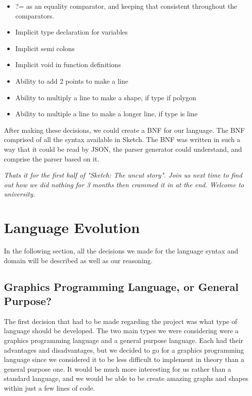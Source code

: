 \documentclass{l3proj}
\begin{document}
\begin{itemize}
\item ?= as an equality comparator, and keeping that consistent throughout the comparators.
\item Implicit type declaration for variables
\item Implicit semi colons
\item Implicit void in function definitions
\item Ability to add 2 points to make a line
\item Ability to multiply a line to make a shape, if type if polygon
\item Ability to multiple a line to make a longer line, if type is line
\end{itemize}

After making these decisions, we could create a BNF for our language. The BNF comprised of all the syntax available in Sketch. The BNF was written in such a way that it could be read by JSON, the parser generator could understand, and comprise the parser based on it.

\textit{Thats it for the first half of "Sketch: The uncut story". Join us next time to find out how we did nothing for 3 months then crammed it in at the end. Welcome to university.}

\chapter{Language Evolution}
\label{evo}
In the following section, all the decisions we made for the language syntax and domain will be described as well as our reasoning. 

\section{Graphics Programming Language, or General Purpose?}
The first decision that had to be made regarding the project was what type of language should be developed. The two main types we were considering were a graphics programming language and a general purpose language. Each had their advantages and disadvantages, but we decided to go for a graphics programming language since we considered it to be less difficult to implement in theory than a general purpose one. It would be much more interesting for us rather than a standard language, and we would be able to be create amazing graphs and shapes within just a few lines of code.  
\end{document}

